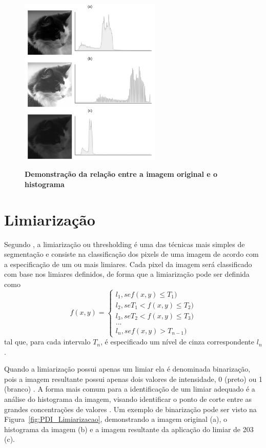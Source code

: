 \documentclass[12pt,oneside,a4paper,english,french,spanish,brazil,]{abntex2}
\begin{document}
\begin{figure}[ht]
\centering
\caption{\textbf{Demonstração da relação entre a imagem original e o histograma}}
\includegraphics[width=0.6\textwidth]{imagens/PDI_Histograma_2.pdf}
\sourceAuthor
\label{fig:PDI_Histograma_2}
\end{figure}

\section{Limiarização}

Segundo \citet{pedrini:2008}, a limiarização ou thresholding é uma das técnicas mais simples de segmentação e consiste na classificação dos pixels de uma imagem de acordo com a especificação de um ou mais limiares. Cada pixel da imagem será classificado com base nos limiares definidos, de forma que a limiarização pode ser definida como \[f(x,y)=\left\{\begin{matrix} l_1, se f(x,y) \leq T_1) \\ l_2, se T_1 < f(x,y) \leq T_2)\\ l_3, se T_2 < f(x,y) \leq T_3)\\ ...\\ l_n, se f(x,y) > T_{n-1}) \end{matrix}\right.\] tal que, para cada intervalo \(T_n\), é especificado um nível de cinza correspondente \(l_n\).

Quando a limiarização possui apenas um limiar ela é denominada binarização, pois a imagem resultante possui apenas dois valores de intensidade, 0 (preto) ou 1 (branco) \cite{pedrini:2008}. A forma mais comum para a identificação de um limiar adequado é a análise do histograma da imagem, visando identificar o ponto de corte entre as grandes concentrações de valores \cite{gonzalez:2012}. Um exemplo de binarização pode ser visto na Figura~\ref{fig:PDI_Limiarizacao}, demonstrando a imagem original (a), o histograma da imagem (b) e a imagem resultante da aplicação do limiar de  203 (c).
\end{document}
